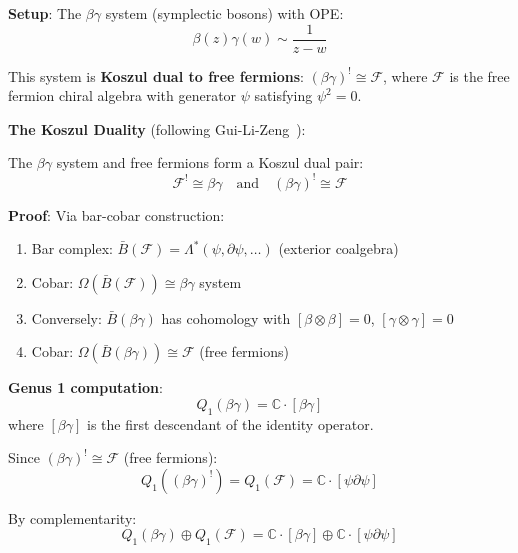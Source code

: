 \begin{example}
\label{ex:betagamma-fermion-koszul-duality}

\textbf{Setup}: The $\beta\gamma$ system (symplectic bosons) with OPE:
\begin{equation}
\beta(z)\gamma(w) \sim \frac{1}{z-w}
\end{equation}

This system is \textbf{Koszul dual to free fermions}: $(\beta\gamma)^! \cong \mathcal{F}$, 
where $\mathcal{F}$ is the free fermion chiral algebra with generator $\psi$ satisfying $\psi^2=0$.

\textbf{The Koszul Duality} (following Gui-Li-Zeng~\cite{GLZ-2212.11252v1}):

\begin{theorem}
The $\beta\gamma$ system and free fermions form a Koszul dual pair:
\begin{equation}
\mathcal{F}^! \cong \beta\gamma \quad \text{and} \quad (\beta\gamma)^! \cong \mathcal{F}
\end{equation}

\textbf{Proof}: Via bar-cobar construction:
\begin{enumerate}
\item Bar complex: $\bar{B}(\mathcal{F}) = \Lambda^*(\psi, \partial\psi, \ldots)$ (exterior coalgebra)
\item Cobar: $\Omega(\bar{B}(\mathcal{F})) \cong \beta\gamma$ system
\item Conversely: $\bar{B}(\beta\gamma)$ has cohomology with $[\beta \otimes \beta] = 0$, $[\gamma \otimes \gamma] = 0$
\item Cobar: $\Omega(\bar{B}(\beta\gamma)) \cong \mathcal{F}$ (free fermions)
\end{enumerate}
\end{theorem}

\textbf{Genus 1 computation}:
\begin{equation}
Q_1(\beta\gamma) = \mathbb{C} \cdot [\beta\gamma]
\end{equation}
where $[\beta\gamma]$ is the first descendant of the identity operator.

Since $(\beta\gamma)^! \cong \mathcal{F}$ (free fermions):
\begin{equation}
Q_1((\beta\gamma)^!) = Q_1(\mathcal{F}) = \mathbb{C} \cdot [\psi \partial\psi]
\end{equation}

By complementarity:
\begin{equation}
Q_1(\beta\gamma) \oplus Q_1(\mathcal{F}) = \mathbb{C} \cdot [\beta\gamma] \oplus \mathbb{C} \cdot [\psi \partial\psi]
\end{equation}


\end{example}

